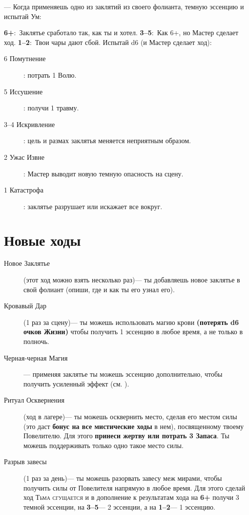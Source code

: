 \documentclass[10pt,twoside]{report}
\begin{document}
\begin{description}[noitemsep]
\item[Колдовство]--- Когда применяешь одно из заклятий из своего
  фолианта, { темную эссенцию и испытай Ум}:
  
 \textbf{6+}:~Заклятье сработало так, как ты и
хотел. \textbf{3--5}:~Как 6+, но Мастер сделает
ход.  \textbf{1--2}:~Твои чары дают сбой. Испытай d6 (и Мастер сделает ход):
  \begin{description}
\item[6 Помутнение]: потрать 1 Волю.
\item[5 Иссушение]: получи 1 травму.
\item[3--4 Искривление]: цель и размах заклятья меняется неприятным образом.
\item[2 Ужас Извне]: Мастер выводит новую темную опасность на сцену.
\item[1 Катастрофа]: заклятье разрушает или искажает все вокруг.
\end{description}
\end{description}
\vfill
\pagebreak

\section*{Новые ходы}
\begin{description}
\item[Новое Заклятье] (этот ход можно взять несколько раз)--- ты
  добавляешь новое заклятье в свой фолиант (опиши, где и как ты его узнал его).
\item[Кровавый Дар] (1 раз за сцену)--- ты можешь использовать магию
  крови {\bfseries (потерять d6 очков Жизни)} чтобы получить 1
  эссенцию в любое время, а не только в полночь.
\item[Черная-черная Магия]--- применяя заклятье ты можешь
  { эссенцию дополнительно}, чтобы получить усиленный эффект (см. {}).
\item[Ритуал Осквернения] (ход в лагере)--- ты можешь осквернить место,
  сделав его местом силы (это даст {\bfseries бонус на все мистические
    ходы} в нем), посвященному твоему Повелителю. Для этого {\bfseries
    принеси   жертву или потрать 3 Запаса}. Ты можешь поддерживать только одно такое место силы.
\item[Разрыв завесы] (1 раз за день)--- ты можешь разорвать завесу меж
  мирами, чтобы получить силы от Повелителя напрямую в любое
  время. Для этого сделай ход {\scshape Тьма сгущается} и в дополнение к результатам хода на \textbf{6+} получи 3 темной эссенции, на \textbf{3--5}--- 2 эссенции, а на \textbf{1--2}--- 1 эссенцию.
\end{description}
\pagebreak
\end{document}
